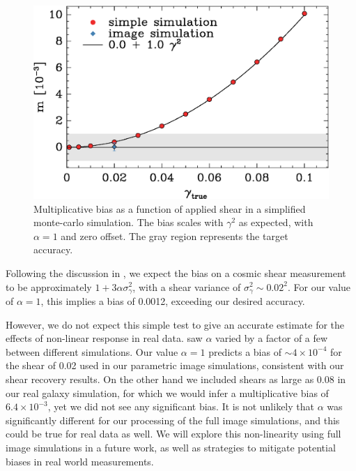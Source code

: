 \documentclass[iop]{emulateapj}
\begin{document}
\begin{figure}
	\centering
    \includegraphics[width=\columnwidth]{weaklens-approx.eps}

	\caption{Multiplicative bias as a function of applied shear in a
	simplified monte-carlo simulation.  The bias scales with $\gamma^2$
	as expected, with $\alpha=1$ and zero offset. The gray
	region represents the target accuracy.}

\label{fig:weaklens}
\end{figure}

Following the discussion in \cite{bfd2016}, we expect the bias on a cosmic
shear measurement to be approximately $1 + 3\alpha\sigma_\gamma^2$, with a
shear variance of $\sigma_\gamma^2 \sim 0.02^2$.  For our value of $\alpha=1$,
this implies a bias of 0.0012, exceeding our desired accuracy.

However, we do not expect this simple test to give an accurate estimate for the
effects of non-linear response in real data.  \cite{bfd2016} saw $\alpha$
varied by a factor of a few between different simulations. Our value $\alpha=1$
predicts a bias of $\sim 4 \times 10^{-4}$ for the shear of 0.02 used in our
parametric image simulations, consistent with our shear recovery results.  On
the other hand we included shears as large as 0.08 in our real galaxy
simulation, for which we would infer a multiplicative bias of $6.4 \times
10^{-3}$, yet we did not see any significant bias.  It is not unlikely that
$\alpha$ was significantly different for our processing of the full image
simulations, and this could be true for real data as well.  We will explore
this non-linearity using full image simulations in a future work, as well as
strategies to mitigate potential biases in real world measurements.
\end{document}
